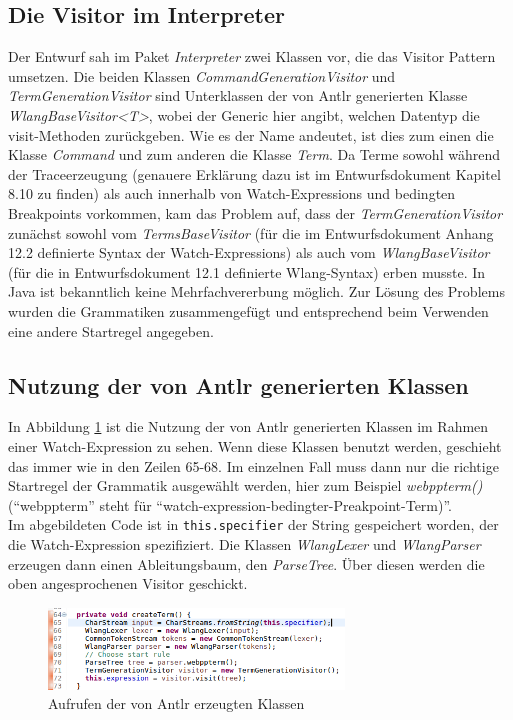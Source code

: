 \documentclass[parskip=full]{scrartcl}
\begin{document}
\subsection{Die Visitor im Interpreter} Der Entwurf sah im Paket \textit{Interpreter} zwei Klassen vor, die das Visitor Pattern umsetzen. Die beiden Klassen \textit{CommandGenerationVisitor} und \textit{TermGenerationVisitor} sind Unterklassen der von Antlr generierten Klasse \textit{WlangBaseVisitor<T>}, wobei der Generic hier angibt, welchen Datentyp die visit-Methoden zurückgeben. Wie es der Name andeutet, ist dies zum einen die Klasse \textit{Command} und zum anderen die Klasse \textit{Term}. 
Da Terme sowohl während der Traceerzeugung (genauere Erklärung dazu ist im Entwurfsdokument Kapitel 8.10 zu finden) als auch innerhalb von Watch-Expressions und bedingten Breakpoints vorkommen, kam das Problem auf, dass der \textit{TermGenerationVisitor} zunächst sowohl vom \textit{TermsBaseVisitor} (für die im Entwurfsdokument Anhang 12.2 definierte Syntax der Watch-Expressions) als auch vom \textit{WlangBaseVisitor} (für die in Entwurfsdokument 12.1 definierte Wlang-Syntax) erben musste. In Java ist bekanntlich keine Mehrfachvererbung möglich. Zur Lösung des Problems wurden die Grammatiken zusammengefügt und entsprechend beim Verwenden eine andere Startregel angegeben. 
\subsection{Nutzung der von Antlr generierten Klassen}
In Abbildung \ref{createTerm} ist die Nutzung der von Antlr generierten Klassen im Rahmen einer Watch-Expression zu sehen. Wenn diese Klassen benutzt werden, geschieht das immer wie in den Zeilen 65-68. Im einzelnen Fall muss dann nur die richtige Startregel der Grammatik ausgewählt werden, hier zum Beispiel \textit{webppterm()} (\enquote{webppterm} steht für \enquote{watch-expression-bedingter-Preakpoint-Term)}. \\
Im abgebildeten Code ist in \texttt{this.specifier} der String gespeichert worden, der die Watch-Expression spezifiziert. Die Klassen \textit{WlangLexer} und \textit{WlangParser} erzeugen dann einen Ableitungsbaum, den \textit{ParseTree}. Über diesen werden die oben angesprochenen Visitor geschickt.
\begin{figure}[!h]
\includegraphics[width=0.7\textwidth]{document_data/createTerm.png}
\caption{Aufrufen der von Antlr erzeugten Klassen}
\label{createTerm}
\end{figure}
\end{document}
